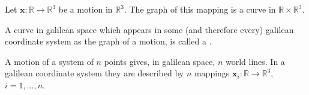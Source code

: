 Let $\mathbf{x}: \mathbb{R} \rightarrow \mathbb{R}^3$ be a motion in $\mathbb{R}^3$. The graph of this mapping is a curve in $\mathbb{R} \times \mathbb{R}^3$.

A curve in galilean space which appears in some (and therefore every) galilean coordinate system as the graph of a motion, is called a .

A motion of a system of $n$ points gives, in galilean space, $n$ world lines. In a galilean coordinate system they are described by $n$ mappings $\mathbf{x}_i: \mathbb{R} \rightarrow \mathbb{R}^3$, $i = 1, \ldots, n$.
